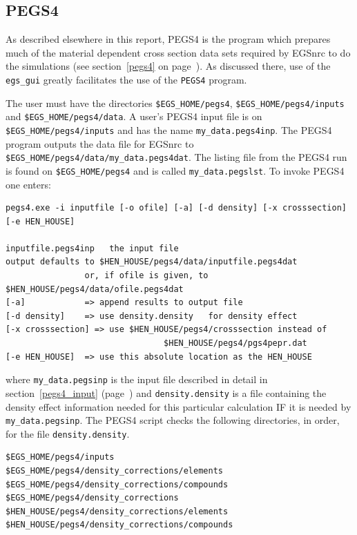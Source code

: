 


\newpage
\subsection{PEGS4}
\label{pegs4_sc}

As described elsewhere in this report, PEGS4 is the program which
prepares much of the material dependent cross section data sets required
by EGSnrc to do the simulations (see section~\ref{pegs4} on
page~\pageref{pegs4}).  As discussed there, use of the {\tt egs\_gui}
greatly facilitates the use of the {\tt PEGS4} program.

The user must have the directories {\tt \$EGS\_HOME/pegs4},
{\tt \$EGS\_HOME/pegs4/inputs} and {\tt \$EGS\_HOME/pegs4/data}.
A user's PEGS4 input file is on {\tt \$EGS\_HOME/pegs4/inputs}
and has the name \verb+my_data.pegs4inp+.  The PEGS4 program outputs the
data file for EGSnrc to
\verb+$EGS_HOME/pegs4/data/my_data.pegs4dat+.
The listing file from the PEGS4
run is found on \verb+$EGS_HOME/pegs4+ and is called \verb+my_data.pegslst+.
To invoke PEGS4 one enters:
\begin{verbatim}
pegs4.exe -i inputfile [-o ofile] [-a] [-d density] [-x crosssection] [-e HEN_HOUSE]

inputfile.pegs4inp   the input file
output defaults to $HEN_HOUSE/pegs4/data/inputfile.pegs4dat
                or, if ofile is given, to $HEN_HOUSE/pegs4/data/ofile.pegs4dat
[-a]            => append results to output file
[-d density]    => use density.density   for density effect
[-x crosssection] => use $HEN_HOUSE/pegs4/crosssection instead of
                                $HEN_HOUSE/pegs4/pgs4pepr.dat
[-e HEN_HOUSE]  => use this absolute location as the HEN_HOUSE
\end{verbatim}
where \verb+my_data.pegsinp+ is the input file described in detail in
section~\ref{pegs4_input} (page~\pageref{pegs4_input}) and
\verb+density.density+
is a file containing the density effect information needed for this
particular calculation IF it is needed by \verb+my_data.pegsinp+.
The PEGS4 script checks the following directories, in order, for
the file \verb+density.density+.
\begin{verbatim}
$EGS_HOME/pegs4/inputs
$EGS_HOME/pegs4/density_corrections/elements
$EGS_HOME/pegs4/density_corrections/compounds
$EGS_HOME/pegs4/density_corrections
$HEN_HOUSE/pegs4/density_corrections/elements
$HEN_HOUSE/pegs4/density_corrections/compounds
\end{verbatim}

